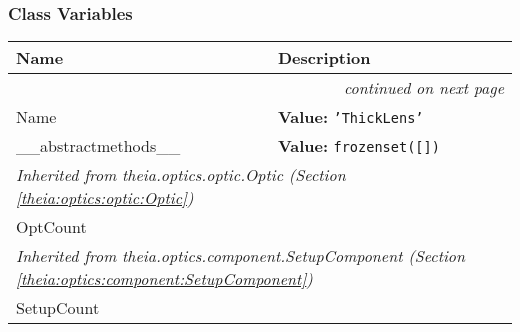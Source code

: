   \subsubsection{Class Variables}

    \vspace{-1cm}
\hspace{\varindent}\begin{longtable}{|p{\varnamewidth}|p{\vardescrwidth}|l}
\cline{1-2}
\cline{1-2} \centering \textbf{Name} & \centering \textbf{Description}& \\
\cline{1-2}
\endhead\cline{1-2}\multicolumn{3}{r}{\small\textit{continued on next page}}\\\endfoot\cline{1-2}
\endlastfoot\raggedright N\-a\-m\-e\- & \raggedright \textbf{Value:} 
{\tt \texttt{'}\texttt{ThickLens}\texttt{'}}&\\
\cline{1-2}
\raggedright \_\-\_\-a\-b\-s\-t\-r\-a\-c\-t\-m\-e\-t\-h\-o\-d\-s\-\_\-\_\- & \raggedright \textbf{Value:} 
{\tt \texttt{frozenset([}\texttt{])}}&\\
\cline{1-2}
\multicolumn{2}{|l|}{\textit{Inherited from theia.optics.optic.Optic \textit{(Section \ref{theia:optics:optic:Optic})}}}\\
\multicolumn{2}{|p{\varwidth}|}{\raggedright OptCount}\\
\cline{1-2}
\multicolumn{2}{|l|}{\textit{Inherited from theia.optics.component.SetupComponent \textit{(Section \ref{theia:optics:component:SetupComponent})}}}\\
\multicolumn{2}{|p{\varwidth}|}{\raggedright SetupCount}\\
\cline{1-2}
\end{longtable}

